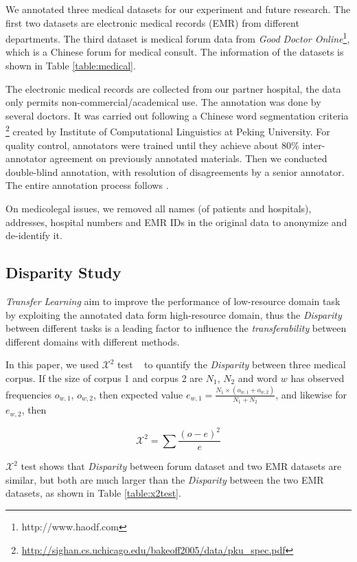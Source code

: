 We annotated three medical datasets for our experiment and future research. The first two datasets are electronic medical records (EMR) from different departments. The third dataset is medical forum data from \textit{Good Doctor Online}\footnote{http://www.haodf.com}, which is a Chinese forum for medical consult. The information of the datasets is shown in Table \ref{table:medical}.

The electronic medical records are collected from our partner hospital, the data only permits non-commercial/academical use. The annotation was done by several doctors. It was carried out following a Chinese word segmentation criteria
\footnote{\url{http://sighan.cs.uchicago.edu/bakeoff2005/data/pku_spec.pdf}} created by Institute of Computational Linguistics at Peking University. For quality control, annotators were trained until they achieve about 80\% inter-annotator agreement on previously annotated materials. Then we conducted double-blind annotation, with resolution of disagreements by a senior annotator. The entire annotation process follows .

On medicolegal issues, we removed all names (of patients and hospitals), addresses, hospital numbers and EMR IDs in the original data to anonymize and de-identify it.

\subsection{Disparity Study}

\textit{Transfer Learning} aim to improve the performance of low-resource domain task by exploiting the annotated data form high-resource domain, thus the \textit{Disparity} between different tasks is a leading factor to influence the \textit{transferability} between different domains with different methods.

In this paper, we used $\mathcal{X}^2$ test ~\cite{DBLP:conf/emnlp/KilgarriffR98} to quantify the \textit{Disparity} between three medical corpus. If the size of corpus 1 and corpus 2 are $N_1$, $N_2$ and word $w$ has observed frequencies $o_{w,1}$, $o_{w,2}$, then expected value $e_{w,1} = \frac{N_1 \times (o_{w,1}+o_{w,2})}{N_1+N_2}$, and likewise for $e_{w,2}$, then 

\begin{equation}
\mathcal{X}^2 = \sum \frac{(o-e)^2}{e}
\end{equation}

$\mathcal{X}^2$ test shows that \textit{Disparity} between forum dataset and two EMR datasets are similar, but both are much larger than the \textit{Disparity} between the two EMR datasets, as shown in Table \ref{table:x2test}.

